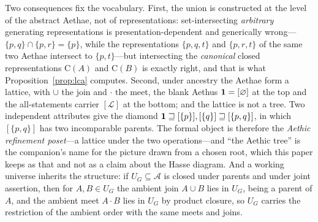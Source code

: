 \noindent Two consequences fix the vocabulary. First, the union is constructed at the level of the abstract Aethae, not of representations: set-intersecting \emph{arbitrary} generating representations is presentation-dependent and generically wrong---$\{p,q\} \cap \{p,r\} = \{p\}$, while the representations $\{p,q,t\}$ and $\{p,r,t\}$ of the same two Aethae intersect to $\{p, t\}$---but intersecting the \emph{canonical} closed representations $\mathrm{C}(A)$ and $\mathrm{C}(B)$ is exactly right, and that is what Proposition~\ref{prop:lca} computes. Second, under ancestry the Aethae form a lattice, with $\cup$ the join and $\cdot$ the meet, the blank Aethus $\mathbf{1} = [\varnothing]$ at the top and the all-statements carrier $[\mathcal{L}]$ at the bottom; and the lattice is not a tree. Two independent attributes give the diamond $\mathbf{1} \sqsupseteq [\{p\}], [\{q\}] \sqsupseteq [\{p,q\}]$, in which $[\{p,q\}]$ has two incomparable parents. The formal object is therefore the \emph{Aethic refinement poset}---a lattice under the two operations---and ``the Aethic tree'' is the companion's name for the picture drawn from a chosen root, which this paper keeps as that and not as a claim about the Hasse diagram. And a working universe inherits the structure: if $U_G \subseteq \mathcal{A}$ is closed under parents and under joint assertion, then for $A, B \in U_G$ the ambient join $A \cup B$ lies in $U_G$, being a parent of $A$, and the ambient meet $A \cdot B$ lies in $U_G$ by product closure, so $U_G$ carries the restriction of the ambient order with the same meets and joins.

